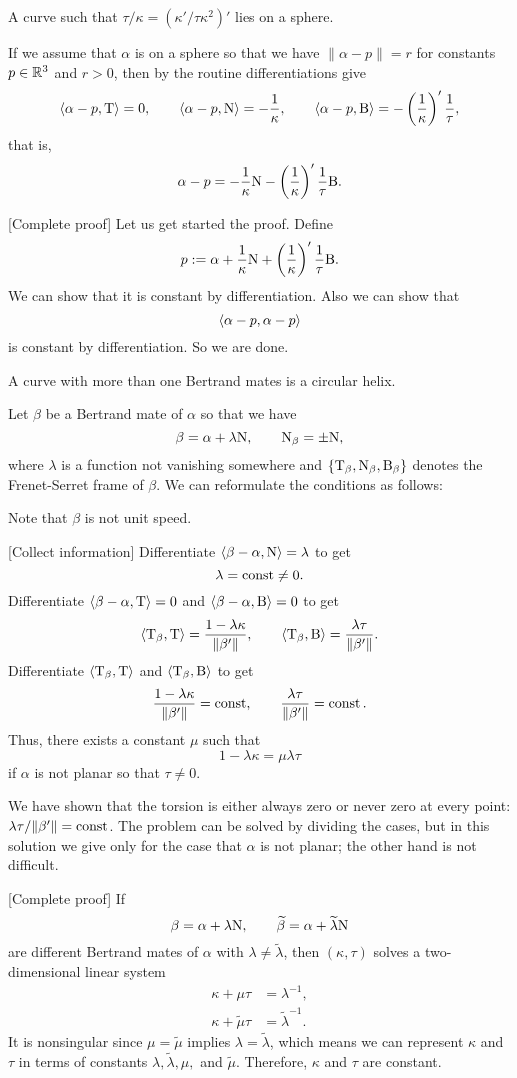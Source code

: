 \documentclass{../../large}
\renewcommand{\a}{\alpha}
\begin{document}
\begin{prb}
A curve such that $\tau/\kappa=(\kappa'/\tau\kappa^2)'$ lies on a sphere.
\end{prb}
\begin{sol}
If we assume that $\a$ is on a sphere so that we have $\|\a-p\|=r$ for constants $p\in\mathbb{R}^3$ and $r>0$, then by the routine differentiations give
\[\<\a-p,\rT\>=0,\qquad\<\a-p,\rN\>=-\frac1\kappa,\qquad\<\a-p,\rB\>=-\left(\frac1\kappa\right)'\frac1\tau,\]
that is,
\[\a-p=-\frac1\kappa\rN-\left(\frac1\kappa\right)'\frac1\tau\rB.\]

[Complete proof]
Let us get started the proof.
Define
\[p:=\a+\frac1\kappa\rN+\left(\frac1\kappa\right)'\frac1\tau\rB.\]
We can show that it is constant by differentiation.
Also we can show that
\[\<\a-p,\a-p\>\]
is constant by differentiation.
So we are done.
\end{sol}

\begin{prb}
A curve with more than one Bertrand mates is a circular helix.
\end{prb}
\begin{sol}
Let $\beta$ be a Bertrand mate of $\a$ so that we have
\[\beta=\a+\lambda\rN,\qquad\rN_\beta=\pm\rN,\]
where $\lambda$ is a function not vanishing somewhere and $\{\mathrm{T}_\beta,\mathrm{N}_\beta,\mathrm{B}_\beta\}$ denotes the Frenet-Serret frame of $\beta$.
We can reformulate the conditions as follows:

Note that $\beta$ is not unit speed.

[Collect information]
Differentiate $\<\beta-\a,\rN\>=\lambda$ to get
\[\lambda=\operatorname{const}\ne0.\]
Differentiate $\<\beta-\a,\rT\>=0$ and $\<\beta-\a,\rB\>=0$ to get
\[\langle\mathrm{T}_\beta,\mathrm{T}\rangle=\frac{1-\lambda\kappa}{\|\beta'\|},\qquad\langle\mathrm{T}_\beta,\mathrm{B}\rangle=\frac{\lambda\tau}{\|\beta'\|}.\]
Differentiate $\langle\mathrm{T}_\beta,\mathrm{T}\rangle$ and $\langle\mathrm{T}_\beta,\mathrm{B}\rangle$ to get
\[\frac{1-\lambda\kappa}{\|\beta'\|}=\operatorname{const},\qquad\frac{\lambda\tau}{\|\beta'\|}=\operatorname{const}.\]
Thus, there exists a constant $\mu$ such that
\[1-\lambda\kappa=\mu\lambda\tau\]
if $\a$ is not planar so that $\tau\ne0$.

We have shown that the torsion is either always zero or never zero at every point: $\lambda\tau/\|\beta'\|=\operatorname{const}$.
The problem can be solved by dividing the cases, but in this solution we give only for the case that $\a$ is not planar; the other hand is not difficult.

[Complete proof]
If
\[\beta=\a+\lambda\rN,\qquad\tilde\beta=\a+\tilde\lambda\rN\]
are different Bertrand mates of $\a$ with $\lambda\ne\tilde\lambda$, then $(\kappa,\tau)$ solves a two-dimensional linear system
\begin{align*}
\kappa+\mu\tau&=\lambda^{-1},\\
\kappa+\tilde\mu\tau&=\tilde\lambda^{-1}.
\end{align*}
It is nonsingular since $\mu=\tilde\mu$ implies $\lambda=\tilde\lambda$, which means we can represent $\kappa$ and $\tau$ in terms of constants $\lambda,\tilde\lambda,\mu,$ and $\tilde\mu$.
Therefore, $\kappa$ and $\tau$ are constant.
\end{sol}
\end{document}
